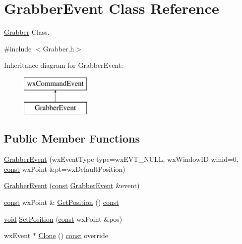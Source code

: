 \hypertarget{class_grabber_event}{}\section{Grabber\+Event Class Reference}
\label{class_grabber_event}


\hyperlink{class_grabber}{Grabber} Class.  




{\ttfamily \#include $<$Grabber.\+h$>$}

Inheritance diagram for Grabber\+Event\+:\begin{figure}[H]
\begin{center}
\leavevmode
\includegraphics[height=2.000000cm]{class_grabber_event}
\end{center}
\end{figure}
\subsection*{Public Member Functions}
\begin{DoxyCompactItemize}
\item 
\hyperlink{class_grabber_event_ad0256ce0079e2b5b58f0115221c21ee6}{Grabber\+Event} (wx\+Event\+Type type=wx\+E\+V\+T\+\_\+\+N\+U\+LL, wx\+Window\+ID winid=0, \hyperlink{getopt1_8c_a2c212835823e3c54a8ab6d95c652660e}{const} wx\+Point \&pt=wx\+Default\+Position)
\item 
\hyperlink{class_grabber_event_a50a7cacbb3bf1a09de6ee794a7a72ed3}{Grabber\+Event} (\hyperlink{getopt1_8c_a2c212835823e3c54a8ab6d95c652660e}{const} \hyperlink{class_grabber_event}{Grabber\+Event} \&event)
\item 
\hyperlink{getopt1_8c_a2c212835823e3c54a8ab6d95c652660e}{const} wx\+Point \& \hyperlink{class_grabber_event_a34ae96481bc56d7a5ab8ae9ae6856529}{Get\+Position} () \hyperlink{getopt1_8c_a2c212835823e3c54a8ab6d95c652660e}{const} 
\item 
\hyperlink{sound_8c_ae35f5844602719cf66324f4de2a658b3}{void} \hyperlink{class_grabber_event_a3ab566de0c7ad46c3c31b8b17e22b3cd}{Set\+Position} (\hyperlink{getopt1_8c_a2c212835823e3c54a8ab6d95c652660e}{const} wx\+Point \&pos)
\item 
wx\+Event $\ast$ \hyperlink{class_grabber_event_ae4a15f7575b0fa8e3a1d0475ce08d8de}{Clone} () \hyperlink{getopt1_8c_a2c212835823e3c54a8ab6d95c652660e}{const}  override
\end{DoxyCompactItemize}
